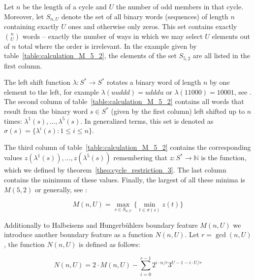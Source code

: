 \documentclass[12pt]{amsart}
\theoremstyle{definition}
\begin{document}
Let $n$ be the length of a cycle and $U$ the number of odd members in that cycle. Moreover, let $S_{n,U}$ denote the set of all binary words (sequences) of length $n$ containing exactly $U$ ones and otherwise only zeros. This set contains exactly $\binom{n}{U}$ words -- exactly the number of ways in which we may select $U$ elements out of $n$ total where the order is irrelevant. In the example given by table~\ref{table:calculation_M_5_2}, the elements of the set $S_{5,2}$ are all listed in the first column.

The left shift function $\lambda:S^\ast\rightarrow S^\ast$ rotates a binary word of length $n$ by one element to the left, for example $\lambda(uuddd)=udddu$ or $\lambda(11000)=10001$, see \cite{Ref_Halbeisen_Hungerbuehler_1997}. The second column of table~\ref{table:calculation_M_5_2} contains all words that result from the binary word $s\in S^\ast$ (given by the first column) left shifted up to $n$ times: $\lambda^1(s),\ldots,\lambda^5(s)$. In generalized terms, this set is denoted as $\sigma(s)=\{\lambda^i(s):1\le i\le n\}$.

The third column of table~\ref{table:calculation_M_5_2} contains the corresponding values $z(\lambda^1(s)),\ldots,z(\lambda^5(s))$ remembering that $z:S^\ast\rightarrow\mathbb{N}$ is the function, which we defined by theorem~\ref{theo:cycle_restriction_3}. The last column contains the minimum of these values. Finally, the largest of all these minima is $M(5,2)$ or generally, see \cite{Ref_Halbeisen_Hungerbuehler_1997}:

\begin{equation}
\label{eq:M_n_U}
M(n,U)=\max_{s\in S_{n,U}}\{\min_{t\in\sigma(s)}z(t)\}
\end{equation}

Additionally to Halbeisens and Hungerbühlers boundary feature $M(n,U)$ we introduce another boundary feature as a function $N(n,U)$. Let $r=\gcd(n, U)$, the function $N(n,U)$ is defined as follows:

\begin{equation}
\label{eq:N_n_U}
N(n,U)=2\cdot M(n,U)-\sum_{i=0}^{r-1}2^{i\cdot n/r}3^{U-1-i\cdot U/r}
\end{equation}
\end{document}
